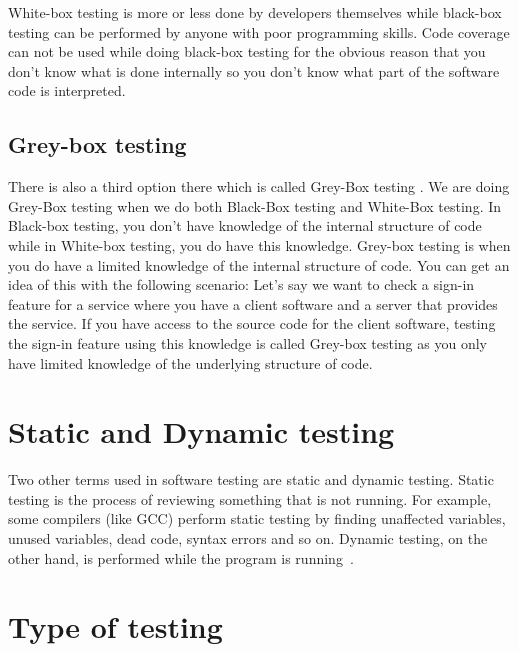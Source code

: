 \documentclass[12pt]{article}
\theoremstyle{definition}
\theoremstyle{definition}
\theoremstyle{remark}
\begin{document}
White-box testing is more or less done by developers themselves while black-box testing can be performed by anyone with poor programming skills. Code coverage can not be used while doing black-box testing for the obvious reason that you don't know what is done internally so you don't know what part of the software code is interpreted.


\subsection{Grey-box testing}

There is also a third option there which is called \guillemotleft Grey-Box testing \guillemotright . We are doing Grey-Box testing when we do both Black-Box testing and White-Box testing. In Black-box testing, you don't have knowledge of the internal structure of code while in White-box testing, you do have this knowledge. Grey-box testing is when you do have a limited knowledge of the internal structure of code. You can get an idea of this with the following scenario: Let's say we want to check a sign-in feature for a service where you have a client software and a server that provides the service. If you have access to the source code for the client software, testing the sign-in feature using this knowledge is called Grey-box testing as you only have limited knowledge of the underlying structure of code.



\section{Static and Dynamic testing}


Two other terms used in software testing are static and dynamic testing. Static testing is the process of reviewing something that is not running. For example, some compilers (like GCC) perform static testing by finding unaffected variables, unused variables, dead code, syntax errors and so on. Dynamic testing, on the other hand, is performed while the program is running~\cite{StaticDynamicTesting:2018}.



\section{Type of testing}
\end{document}
